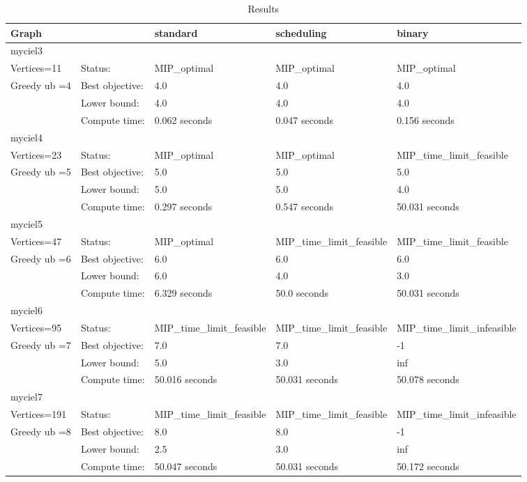 \documentclass[a4paper,11pt]{article}
\begin{document}
\begin{table}[]
\centering
\caption{Results}
\label{table}
\begin{tabular}{l||l|l|l|l}
Graph & &standard &scheduling  &binary\\
\toprule
myciel3&&&&\\
Vertices=11 &Status: &MIP\_optimal  &MIP\_optimal &MIP\_optimal\\
\cline{2-5}
Greedy ub =4&Best objective: &4.0  &4.0 &4.0\\
\cline{2-5}
&Lower bound: &4.0  &4.0 &4.0\\
\cline{2-5}
&Compute time: &0.062 seconds  &0.047 seconds &0.156 seconds\\
\hline
myciel4&&&&\\
Vertices=23 &Status: &MIP\_optimal  &MIP\_optimal &MIP\_time\_limit\_feasible\\
\cline{2-5}
Greedy ub =5&Best objective: &5.0  &5.0 &5.0\\
\cline{2-5}
&Lower bound: &5.0  &5.0 &4.0\\
\cline{2-5}
&Compute time: &0.297 seconds  &0.547 seconds &50.031 seconds\\
\hline
myciel5&&&&\\
Vertices=47 &Status: &MIP\_optimal  &MIP\_time\_limit\_feasible &MIP\_time\_limit\_feasible\\
\cline{2-5}
Greedy ub =6&Best objective: &6.0  &6.0 &6.0\\
\cline{2-5}
&Lower bound: &6.0  &4.0 &3.0\\
\cline{2-5}
&Compute time: &6.329 seconds  &50.0 seconds &50.031 seconds\\
\hline
myciel6&&&&\\
Vertices=95 &Status: &MIP\_time\_limit\_feasible  &MIP\_time\_limit\_feasible &MIP\_time\_limit\_infeasible\\
\cline{2-5}
Greedy ub =7&Best objective: &7.0  &7.0 &-1\\
\cline{2-5}
&Lower bound: &5.0  &3.0 &inf\\
\cline{2-5}
&Compute time: &50.016 seconds  &50.031 seconds &50.078 seconds\\
\hline
myciel7&&&&\\
Vertices=191 &Status: &MIP\_time\_limit\_feasible  &MIP\_time\_limit\_feasible &MIP\_time\_limit\_infeasible\\
\cline{2-5}
Greedy ub =8&Best objective: &8.0  &8.0 &-1\\
\cline{2-5}
&Lower bound: &2.5  &3.0 &inf\\
\cline{2-5}
&Compute time: &50.047 seconds  &50.031 seconds &50.172 seconds\\
\hline
\bottomrule
\end{tabular}
\end{table}
\end{document}
